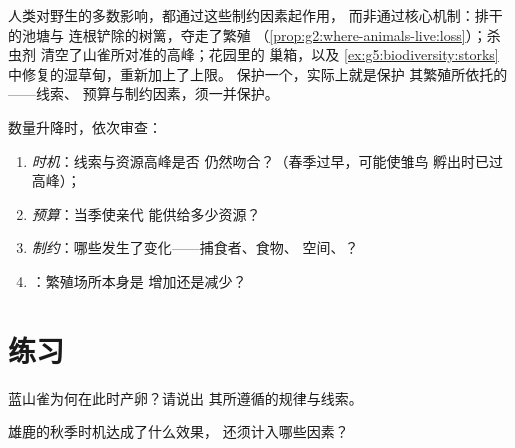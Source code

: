 \begin{remark}[人类改变制约因素]\label{rem:g8:reproduction-and-environment:humans}
人类对野生的多数影响，都通过这些制约因素起作用，
而非通过核心机制：排干的池塘与
连根铲除的树篱，夺走了繁殖
（\cref{prop:g2:where-animals-live:loss}）；杀虫剂
清空了山雀所对准的高峰；花园里的
巢箱，以及
\cref{ex:g5:biodiversity:storks}中修复的湿草甸，重新加上了上限。
保护一个，实际上就是保护
其繁殖所依托的——线索、
预算与制约因素，须一并保护。
\end{remark}

\begin{method}[审查种群变化]\label{met:g8:reproduction-and-environment:audit}
数量升降时，依次审查：
\begin{enumerate}
  \item \emph{时机}：线索与资源高峰是否
        仍然吻合？（春季过早，可能使雏鸟
        孵出时已过高峰）；
  \item \emph{预算}：当季使亲代
        能供给多少资源？
  \item \emph{制约}：哪些发生了变化——捕食者、食物、
        空间、？
  \item \emph{}：繁殖场所本身是
        增加还是减少？
\end{enumerate}
\end{method}

\section{练习}

\begin{exercise}[$\star$]\label{exo:g8:reproduction-and-environment:1}
蓝山雀为何在此时产卵？请说出
其所遵循的规律与线索。
\end{exercise}

\begin{exercise}[$\star$]\label{exo:g8:reproduction-and-environment:2}
雄鹿的秋季时机达成了什么效果，
还须计入哪些因素？
\end{exercise}

